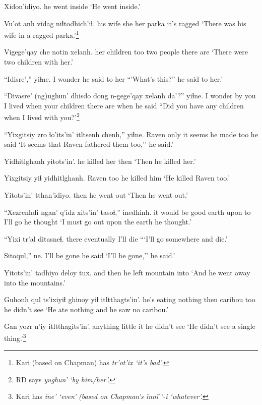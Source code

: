 \documentclass[12pt]{article}
\begin{document}
\gll Xidon'idiyo.
{{he went inside}}
\glt `He went inside.'
\glend

\gll Vu'ot  anh vidag  niɬtodhich'iɬ.
{his wife} she {her parka} {it's ragged}
\glt `There was his wife in a ragged parka.'\footnote{Kari (based on Chapman) has \em tr'ot'ix \em `it's bad'.}
\glend

\gll Vigege'qay che notin xelanh.
{her children} too {two people} {there are}
\glt `There were two children with her.'
\glend

\gll ``Idisre','' yiɬne.
{I wonder} {he said to her}
\glt ``'What's this?'' he said to her.'
\glend

\gll ``Divasre' (ng)ughun' dhisdo dong n-gege'qay  xelanh da'?''  yiɬne.
{I wonder} {by you} {I lived} when {your children} {there are} when {he said}
\glt ``Did you have any children when I lived with you?'\footnote{RD says \em yughun' \em `by him/her'.}
\glend

\gll ``Yixgitsiy zro ɬo'its'in' itltsenh chenh,'' yiɬne.
Raven only {it seems} {he made} too  {he said}
\glt `It seems that Raven fathered them too,'' he said.'
\glend

\gll Yidhitlghanh yitots'in'.
{{he killed her}}  then
\glt `Then he killed her.'
\glend

\gll Yixgitsiy yiɬ yidhitlghanh.
Raven  too {he killed him}
\glt `He killed Raven too.'
\glend

\gll Yitots'in' tthan'idiyo.
then  {he went out}
\glt `Then he went out.'
\glend

\gll ``Xezrenhdi  ngan' q'idz xits'in' tasoɬ,'' inedhinh.
{it would be good} earth upon to {I'll go} {he thought}
\glt `I must go out upon the earth he thought.'
\glend

\gll ``Yixi  tr'al  ditasneɬ.
there  eventually {I'll die}
\glt ```I'll go somewhere and die.'
\glend

\gll Sitoqul,'' ne.
{I'll be gone} {he said}
\glt `I'll be gone,'' he said.'
\glend

\gll Yitots'in' tadhiyo deloy tux.
{and then} {he left} mountain into
\glt `And he went away into the mountains.'
\glend

\gll Guhonh qul  ts'ixiyiɬ ghinoy yiɬ {itltthagts'in'.}
{he's eating} nothing then  caribou  too {he didn't see}
\glt `He ate nothing and he saw no caribou.'
\glend

\gll Gan yozr n'iy itltthagits'in'.
anything little it {he didn't see}
\glt `He didn't see a single thing.'\footnote{Kari has \em ine' \em `even' (based on Chapman's \em\u{i}nn\u{i}ˊ'-i \em `whatever'.}
\glend
\end{document}

